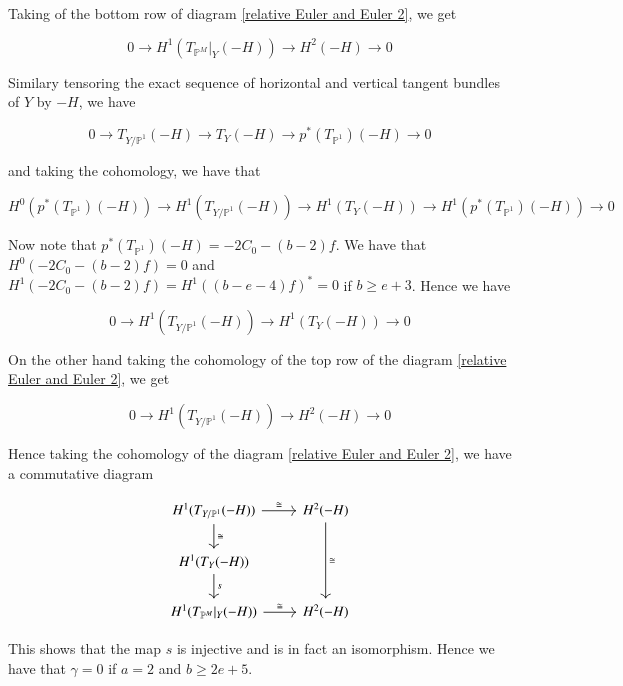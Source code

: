 \documentclass[11pt,twoside]{amsart}
\theoremstyle{plain}
\numberwithin{equation}{section}
\theoremstyle{definition}
\begin{document}
Taking of the bottom row of diagram \ref{relative Euler and Euler 2}, we get 

\begin{equation}\label{36}
    0 \to H^1(T_{\mathbb{P}^M}|_Y(-H)) \to H^2(-H) \to 0
\end{equation}

Similary tensoring the exact sequence of horizontal and vertical tangent bundles of $Y$ by $-H$, we have

\begin{equation}\label{37}
    0 \to T_{Y/\mathbb{P}^1}(-H) \to T_Y(-H) \to p^*(T_{\mathbb{P}^1})(-H) \to 0
\end{equation}

and taking the cohomology, we have that 

\begin{equation}\label{38}
    H^0(p^*(T_{\mathbb{P}^1})(-H)) \to H^1(T_{Y/\mathbb{P}^1}(-H)) \to H^1(T_Y(-H)) \to H^1(p^*(T_{\mathbb{P}^1})(-H)) \to 0
\end{equation}

Now note that $p^*(T_{\mathbb{P}^1})(-H) = -2C_0-(b-2)f$. We have that $H^0(-2C_0-(b-2)f) = 0$ and $H^1(-2C_0-(b-2)f) = H^1((b-e-4)f)^* = 0$ if $b \geq e+3$. Hence we have 

\begin{equation}\label{39}
    0 \to H^1(T_{Y/\mathbb{P}^1}(-H)) \to H^1(T_Y(-H)) \to  0
\end{equation}

On the other hand taking the cohomology of the top row of the diagram \ref{relative Euler and Euler 2}, we get 

\begin{equation}\label{41}
    0 \to H^1(T_{Y/\mathbb{P}^1}(-H)) \to H^2(-H) \to 0
\end{equation}

Hence taking the cohomology of the diagram \ref{relative Euler and Euler 2}, we have a commutative diagram

\[
\begin{tikzcd}
    H^1(T_{Y/\mathbb{P}^1}(-H)) \arrow[d, "\cong"] \arrow[r, "\cong"] & H^2(-H) \arrow[dd, "\cong"] \\
     H^1(T_{Y}(-H)) \arrow[d, "s"] & \\
     H^1(T_{\mathbb{P}^M}|_Y(-H)) \arrow[r, "\cong"] & H^2(-H)
\end{tikzcd}
\]

This shows that the map $s$ is injective and is in fact an isomorphism. Hence we have that $\gamma = 0$ if $a = 2$ and $b \geq 2e+5$. \\
\end{document}
